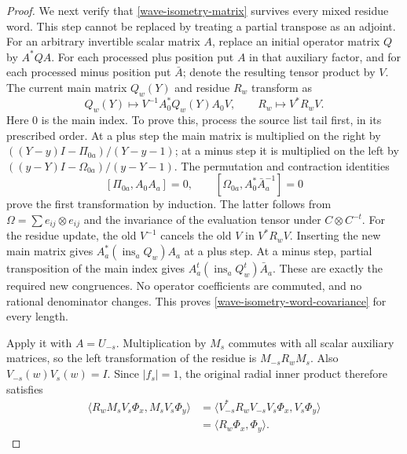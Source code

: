 \begin{proof}
We next verify that \eqref{wave-isometry-matrix} survives every
mixed residue word.  This step cannot be replaced by treating a
partial transpose as an adjoint.  For an arbitrary invertible scalar
matrix $A$, replace an initial operator matrix $Q$ by $A^*QA$.
For each processed plus position put $A$ in that auxiliary factor,
and for each processed minus position put $\bar A$; denote the
resulting tensor product by $V$.  The current main matrix $Q_w(Y)$
and residue $R_w$ transform as
\begin{equation}\label{wave-isometry-word-covariance}
       Q_w(Y)\longmapsto V^{-1}A_0^*Q_w(Y)A_0V,
       \qquad R_w\longmapsto V^*R_wV.
\end{equation}
Here $0$ is the main index.  To prove this, process the source
list tail first, in its prescribed order.  At a plus step the
main matrix is multiplied on the right by
$((Y-y)I-\Pi_{0a})/(Y-y-1)$; at a minus step it is multiplied
on the left by $((y-Y)I-\Omega_{0a})/(y-Y-1)$.
The permutation and contraction identities
\[
 [\Pi_{0a},A_0A_a]=0,
 \qquad
 [\Omega_{0a},A_0^*\bar A_a^{-1}]=0
\]
prove the first transformation by induction.  The latter follows
from $\Omega=\sum e_{ij}\otimes e_{ij}$ and the invariance of
the evaluation tensor under $C\otimes C^{-t}$.
For the residue update, the old $V^{-1}$ cancels the old $V$
in $V^*R_wV$.  Inserting the new main matrix gives
$A_a^*(\operatorname{ins}_aQ_w)A_a$ at a plus step.
At a minus step, partial transposition of the main index gives
$A_a^t(\operatorname{ins}_aQ_w^t)\bar A_a$.
These are exactly the required new congruences.  No operator
coefficients are commuted, and no rational denominator changes.
This proves \eqref{wave-isometry-word-covariance} for every length.

Apply it with $A=U_{-s}$.  Multiplication by $M_s$ commutes with
all scalar auxiliary matrices, so the left transformation of the
residue is $M_{-s}R_wM_s$.  Also
$V_{-s}(w)V_s(w)=I$.  Since $|f_s|=1$, the original radial
inner product therefore satisfies
\[
 \begin{split}
 \langle R_wM_sV_s\Phi_x,M_sV_s\Phi_y\rangle
 &=\langle V_{-s}^*R_wV_{-s}V_s\Phi_x,V_s\Phi_y\rangle\\
 &=\langle R_w\Phi_x,\Phi_y\rangle.
 \end{split}
\]


\end{proof}
